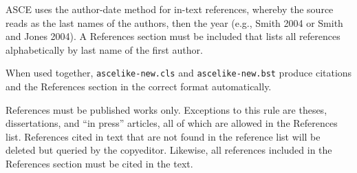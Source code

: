 \documentclass[Journal,letterpaper]{ascelike-new}
\begin{document}
	ASCE uses the author-date method for in-text references, whereby the source reads as the last names of the authors, then the year (e.g., Smith 2004 or Smith and Jones 2004). A References section must be included that lists all references alphabetically by last name of the first author. 
	
	When used together, \texttt{ascelike-new.cls} and \texttt{ascelike-new.bst} produce citations and the References section in the correct format automatically.
	
	References must be published works only. Exceptions to this rule are theses, dissertations, and ``in press'' articles, all of which are allowed in the References list. References cited in text that are not found in the reference list will be deleted but queried by the copyeditor. Likewise, all references included in the References section must be cited in the text.
	
\end{document}
